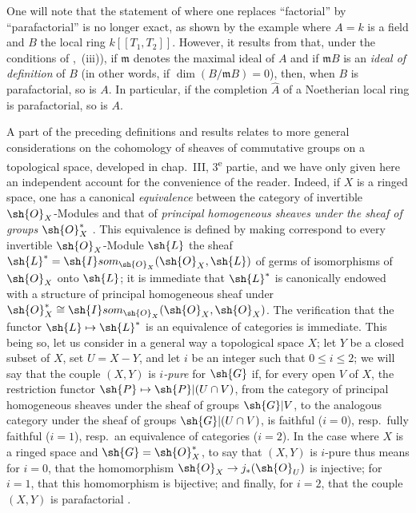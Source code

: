 \begin{env}[21.13.12.1]
\label{IV.21.13.12.1}
One will note that the statement of  where one replaces ``factorial'' by ``parafactorial'' is no longer exact, as shown by the example where $A=k$ is a field and $B$ the local ring $k[[T_1,T_2]]$.
However, it results from  that, under the conditions of ,~(iii)), if $\mathfrak{m}$ denotes the maximal ideal of $A$ and if $\mathfrak{m}B$ is an \emph{ideal of definition} of $B$ (in other words, if $\dim(B/\mathfrak{m}B)=0$), then, when $B$ is parafactorial, so is $A$.
In particular, if the completion $\hat{A}$ of a Noetherian local ring is parafactorial, so is $A$.
\end{env}


\begin{remark}[21.13.13]
\label{IV.21.13.13}
A part of the preceding definitions and results relates to more general considerations on the cohomology of sheaves of commutative groups on a topological space, developed in chap.~III, 3\textsuperscript{e} partie, and we have only given here an independent account for the convenience of the reader.
Indeed, if $X$ is a ringed space, one has a canonical \emph{equivalence} between the category of invertible $\sh{O}_X$-Modules and that of \emph{principal homogeneous sheaves under the sheaf of groups} $\sh{O}_X^*$ .
This equivalence is defined by making correspond to every invertible $\sh{O}_X$-Module $\sh{L}$ the sheaf $\sh{L}^*=\sh{I}som_{\sh{O}_X}(\sh{O}_X,\sh{L})$ of germs of isomorphisms of $\sh{O}_X$ onto $\sh{L}$; it is immediate that $\sh{L}^*$ is canonically endowed with a structure of principal homogeneous sheaf under $\sh{O}_X^*\cong\sh{I}som_{\sh{O}_X}(\sh{O}_X,\sh{O}_X)$.
The verification that the functor $\sh{L}\mapsto\sh{L}^*$ is an equivalence of categories is immediate.
This being so, let us consider in a general way a topological space $X$; let $Y$ be a closed subset of $X$, set $U=X-Y$, and let $i$ be an integer such that $0\leq i\leq 2$; we will say that the couple $(X,Y)$ is \emph{$i$-pure} for $\sh{G}$ if, for every open $V$ of $X$, the restriction functor $\sh{P}\mapsto\sh{P}|(U\cap V)$, from the category of principal homogeneous sheaves under the sheaf of groups $\sh{G}|V$, to the analogous category under the sheaf of groups $\sh{G}|(U\cap V)$, is faithful ($i=0$), resp.\ fully faithful ($i=1$), resp.\ an equivalence of categories ($i=2$).
In the case where $X$ is a ringed space and $\sh{G}=\sh{O}_X^*$, to say that $(X,Y)$ is $i$-pure thus means for $i=0$, that the homomorphism $\sh{O}_X\to j_*(\sh{O}_U)$ is injective; for $i=1$, that this homomorphism is bijective; and finally, for $i=2$, that the couple $(X,Y)$ is parafactorial .


\end{remark}
